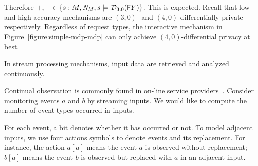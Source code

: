 Therefore $+, - \in \{ s : M, \mathit{N}_{M}, s \models \mathcal{D}_{{3}, {0}}
(\mathsf{F} Y) \}$. This is expected. Recall that low- and high-accuracy
mechanisms are $(3, 0)$- and $(4, 0)$-differentially private
respectively. Regardless of request types, the interactive mechanism
in Figure~\ref{figure:simple-mdp-mdp} can only achieve $(4,
0)$-differential privacy at best.

In stream
processing mechanisms, input data are retrieved and analyzed
continuously. 

Continual observation is commonly found in on-line service
providers~\cite{DNPR:10:DPCO,DNPRY:10:PPSA}. 
Consider monitoring events $a$ and $b$ by streaming inputs. We would
like to compute the number of event types occurred in inputs. 

For each event, a bit denotes whether it has occurred or not. To model
adjacent inputs, we use four actions symbols to denote events and its
replacement. For instance, the action $a[a]$ means the event $a$ is
observed without replacement; $b[a]$ means the event $b$ is observed
but replaced with $a$ in an adjacent input. 

